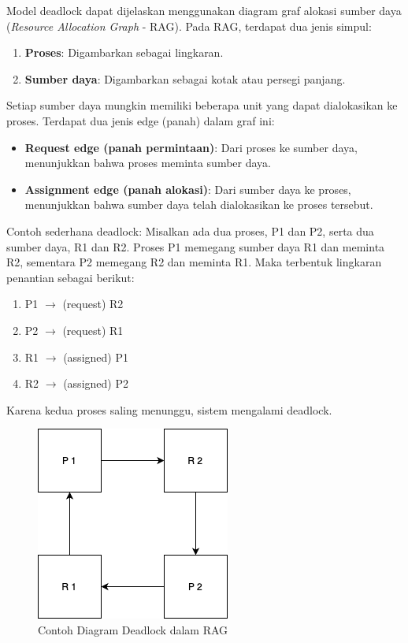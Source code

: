 \documentclass[12pt]{article}
\begin{document}
Model deadlock dapat dijelaskan menggunakan diagram graf alokasi sumber daya (\textit{Resource Allocation Graph} - RAG). Pada RAG, terdapat dua jenis simpul:

\begin{enumerate}
    \item \textbf{Proses}: Digambarkan sebagai lingkaran.
    \item \textbf{Sumber daya}: Digambarkan sebagai kotak atau persegi panjang.
\end{enumerate}

Setiap sumber daya mungkin memiliki beberapa unit yang dapat dialokasikan ke proses. Terdapat dua jenis edge (panah) dalam graf ini:

\begin{itemize}
    \item \textbf{Request edge (panah permintaan)}: Dari proses ke sumber daya, menunjukkan bahwa proses meminta sumber daya.
    \item \textbf{Assignment edge (panah alokasi)}: Dari sumber daya ke proses, menunjukkan bahwa sumber daya telah dialokasikan ke proses tersebut.
\end{itemize}

Contoh sederhana deadlock: Misalkan ada dua proses, P1 dan P2, serta dua sumber daya, R1 dan R2. Proses P1 memegang sumber daya R1 dan meminta R2, sementara P2 memegang R2 dan meminta R1. Maka terbentuk lingkaran penantian sebagai berikut:

\begin{enumerate}
    \item P1 $\rightarrow$ (request) R2
    \item P2 $\rightarrow$ (request) R1
    \item R1 $\rightarrow$ (assigned) P1
    \item R2 $\rightarrow$ (assigned) P2
\end{enumerate}

Karena kedua proses saling menunggu, sistem mengalami deadlock.

\begin{figure}[htbp]
    \centering
    \includegraphics[width=0.5\linewidth]
    {asset/deadlockRAG.drawio.png}
    \caption{Contoh Diagram Deadlock dalam RAG}
    \label{fig:deadlock-RAG}
\end{figure}
\end{document}
